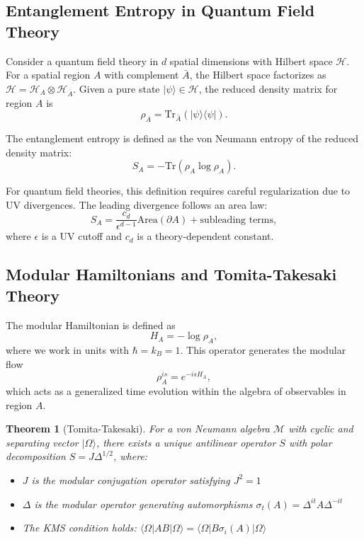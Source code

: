 \documentclass[11pt,letterpaper]{article}
\newtheorem{theorem}{Theorem}[section]
\newcommand{\Hil}{\mathcal{H}}
\begin{document}
\subsection{Entanglement Entropy in Quantum Field Theory}

Consider a quantum field theory in $d$ spatial dimensions with Hilbert space $\Hil$. For a spatial region $A$ with complement $\bar{A}$, the Hilbert space factorizes as $\Hil = \Hil_A \otimes \Hil_{\bar{A}}$. Given a pure state $|\psi\rangle \in \Hil$, the reduced density matrix for region $A$ is
\begin{equation}
\rho_A = \text{Tr}_{\bar{A}}(|\psi\rangle\langle\psi|).
\end{equation}

The entanglement entropy is defined as the von Neumann entropy of the reduced density matrix:
\begin{equation}
S_A = -\text{Tr}(\rho_A \log \rho_A).
\label{eq:entanglement_entropy}
\end{equation}

For quantum field theories, this definition requires careful regularization due to UV divergences. The leading divergence follows an area law:
\begin{equation}
S_A = \frac{c_d}{\epsilon^{d-1}} \text{Area}(\partial A) + \text{subleading terms},
\end{equation}
where $\epsilon$ is a UV cutoff and $c_d$ is a theory-dependent constant.

\subsection{Modular Hamiltonians and Tomita-Takesaki Theory}

The modular Hamiltonian is defined as
\begin{equation}
H_A = -\log \rho_A,
\label{eq:modular_hamiltonian}
\end{equation}
where we work in units with $\hbar = k_B = 1$. This operator generates the modular flow
\begin{equation}
\rho_A^{is} = e^{-isH_A},
\end{equation}
which acts as a generalized time evolution within the algebra of observables in region $A$.

\begin{theorem}[Tomita-Takesaki]
For a von Neumann algebra $\mathcal{M}$ with cyclic and separating vector $|\Omega\rangle$, there exists a unique antilinear operator $S$ with polar decomposition $S = J\Delta^{1/2}$, where:
\begin{itemize}
\item $J$ is the modular conjugation operator satisfying $J^2 = 1$
\item $\Delta$ is the modular operator generating automorphisms $\sigma_t(A) = \Delta^{it}A\Delta^{-it}$
\item The KMS condition holds: $\langle\Omega|AB|\Omega\rangle = \langle\Omega|B\sigma_i(A)|\Omega\rangle$
\end{itemize}
\end{theorem}
\end{document}
